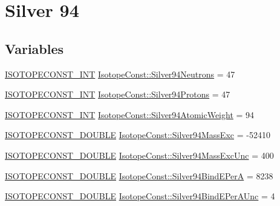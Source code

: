 \hypertarget{group___isotope_const-_silver-_ag94}{}\section{Silver 94}
\label{group___isotope_const-_silver-_ag94}
\subsection*{Variables}
\begin{DoxyCompactItemize}
\item 
\mbox{\hyperlink{group___isotope_const-_macros_ga5f18360b3e99483a35c32d789e62621c}{I\+S\+O\+T\+O\+P\+E\+C\+O\+N\+S\+T\+\_\+\+I\+NT}} \mbox{\hyperlink{group___isotope_const-_silver-_ag94_ga29eb9df687bd15846e3e4d6a93f4b4ac}{Isotope\+Const\+::\+Silver94\+Neutrons}} = 47
\item 
\mbox{\hyperlink{group___isotope_const-_macros_ga5f18360b3e99483a35c32d789e62621c}{I\+S\+O\+T\+O\+P\+E\+C\+O\+N\+S\+T\+\_\+\+I\+NT}} \mbox{\hyperlink{group___isotope_const-_silver-_ag94_ga8e11af340acfd3ec7cf288e97f51a95a}{Isotope\+Const\+::\+Silver94\+Protons}} = 47
\item 
\mbox{\hyperlink{group___isotope_const-_macros_ga5f18360b3e99483a35c32d789e62621c}{I\+S\+O\+T\+O\+P\+E\+C\+O\+N\+S\+T\+\_\+\+I\+NT}} \mbox{\hyperlink{group___isotope_const-_silver-_ag94_ga02ad799dcf0aab3e61dc5f3f7c143081}{Isotope\+Const\+::\+Silver94\+Atomic\+Weight}} = 94
\item 
\mbox{\hyperlink{group___isotope_const-_macros_ga8f45a7272ce02c0b4c65c44636ed719a}{I\+S\+O\+T\+O\+P\+E\+C\+O\+N\+S\+T\+\_\+\+D\+O\+U\+B\+LE}} \mbox{\hyperlink{group___isotope_const-_silver-_ag94_ga541c390b5d6cd155cdc27a1ed2f0023c}{Isotope\+Const\+::\+Silver94\+Mass\+Exc}} = -\/52410
\item 
\mbox{\hyperlink{group___isotope_const-_macros_ga8f45a7272ce02c0b4c65c44636ed719a}{I\+S\+O\+T\+O\+P\+E\+C\+O\+N\+S\+T\+\_\+\+D\+O\+U\+B\+LE}} \mbox{\hyperlink{group___isotope_const-_silver-_ag94_ga42163c6d44d21cd3c32841ca6b0ead69}{Isotope\+Const\+::\+Silver94\+Mass\+Exc\+Unc}} = 400
\item 
\mbox{\hyperlink{group___isotope_const-_macros_ga8f45a7272ce02c0b4c65c44636ed719a}{I\+S\+O\+T\+O\+P\+E\+C\+O\+N\+S\+T\+\_\+\+D\+O\+U\+B\+LE}} \mbox{\hyperlink{group___isotope_const-_silver-_ag94_ga5819df665cf02498444ad6043a2589b2}{Isotope\+Const\+::\+Silver94\+Bind\+E\+PerA}} = 8238
\item 
\mbox{\hyperlink{group___isotope_const-_macros_ga8f45a7272ce02c0b4c65c44636ed719a}{I\+S\+O\+T\+O\+P\+E\+C\+O\+N\+S\+T\+\_\+\+D\+O\+U\+B\+LE}} \mbox{\hyperlink{group___isotope_const-_silver-_ag94_ga1cb8b24d4958570bdac3f9de02c66201}{Isotope\+Const\+::\+Silver94\+Bind\+E\+Per\+A\+Unc}} = 4

\end{DoxyCompactItemize}
